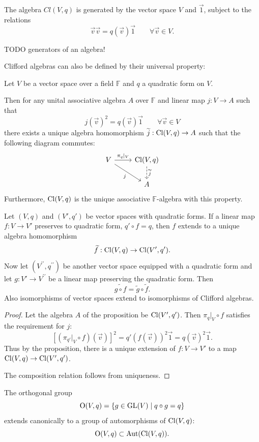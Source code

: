 \begin{lemma} \label{CliffordRelation}
The algebra $Cl(V,q)$ is generated by the vector space $V$ and $\vec{1}$, subject to the relations
\[ \vec{v}\vec{v} = q(\vec{v})\vec{1} \qquad \forall \vec{v}\in V. \]
\end{lemma}
TODO generators of an algebra!


Clifford algebras can also be defined by their universal property:
\begin{proposition} \label{CliffordUniversalProperty}
Let $V$ be a vector space over a field $\mathbb{F}$ and $q$ a quadratic form on $V$. 

Then for any unital associative algebra $A$ over $\mathbb{F}$ and linear map $j: V \to A$ such that
\[ j(\vec{v})^2 = q(\vec{v}) \vec{1} \qquad \forall \vec{v}\in V \]
there exists a unique algebra homomorphism $\widetilde{j}: \operatorname{Cl}(V,q)\to A$ such that the following diagram commutes:
\[ \begin{tikzcd}
V \rar{\pi_q|_V} \ar[dr, swap, "{j}"] & \Cl(V,q) \dar[dashed]{\widetilde{j}} \\
 & A
\end{tikzcd} \]
Furthermore, $\operatorname{Cl}(V,q)$ is the unique associative $\mathbb{F}$-algebra with this property.
\end{proposition}
\begin{corollary}
Let $(V,q)$ and $(V',q')$ be vector spaces with quadratic forms. If a linear map $f:V\to V'$ preserves to quadratic form, $q'\circ f = q$, then $f$ extends to a unique algebra homomorphism
\[ \widetilde{f}: \operatorname{Cl}(V,q) \to \operatorname{Cl}(V',q'). \]
Now let $(V^{\prime\prime},q^{\prime\prime})$ be another vector space equipped with a quadratic form and let $g: V'\to V^{\prime\prime}$ be a linear map preserving the quadratic form. Then
\[ \widetilde{g\circ f} = \widetilde{g}\circ\widetilde{f}. \]
Also isomorphisms of vector spaces extend to isomorphisms of Clifford algebras.
\end{corollary}
\begin{proof}
Let the algebra $A$ of the proposition be $\operatorname{Cl}(V',q')$. Then $\pi_q|_V\circ f$ satisfies the requirement for $j$:
\[ [(\pi_{q'}|_V\circ f)(\vec{v})]^2 = q'(f(\vec{v}))^2 \vec{1} = q(\vec{v})^2\vec{1}. \]
Thus by the proposition, there is a unique extension of $f:V\to V'$ to a map $\operatorname{Cl}(V,q) \to \operatorname{Cl}(V',q')$.

The composition relation follows from uniqueness.
\end{proof}
\begin{corollary} \label{qOrthogonalMaps}
The orthogonal group
\[ \Ogroup(V,q) = \setbuilder{g\in\GL(V)}{q\circ g = q} \]
extends canonically to a group of automorphisms of $\operatorname{Cl}(V,q)$:
\[ \operatorname{O}(V,q) \subset \operatorname{Aut}(\operatorname{Cl}(V,q)). \]
\end{corollary}

